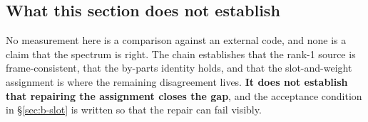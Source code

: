 \subsection{What this section does not establish}
No measurement here is a comparison against an external code, and none is a
claim that the spectrum is right. The chain establishes that the rank-1 source
is frame-consistent, that the by-parts identity holds, and that the slot-and-weight
assignment is where the remaining disagreement lives. \textbf{It does not
establish that repairing the assignment closes the gap}, and the acceptance
condition in \S\ref{sec:b-slot} is written so that the repair can fail
visibly.
